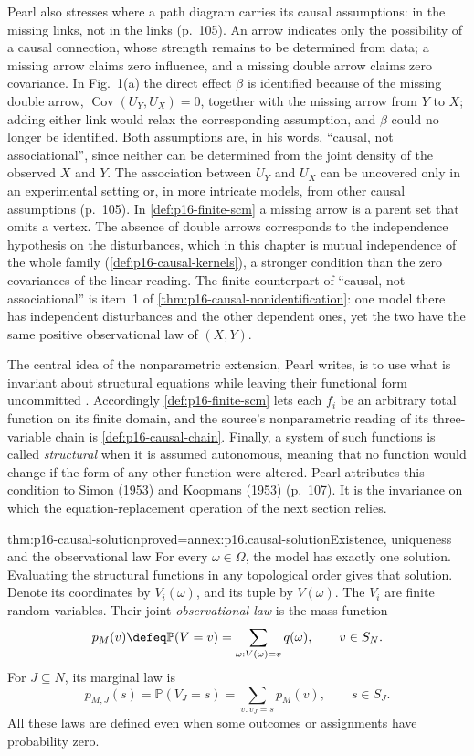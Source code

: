 Pearl also stresses where a path diagram carries its causal assumptions:
in the missing links, not in the links (p.~105). An arrow indicates only
the possibility of a causal connection, whose strength remains to be
determined from data; a missing arrow claims zero influence, and a
missing double arrow claims zero covariance. In Fig.~1(a) the direct
effect \(\beta\) is identified because of the missing double arrow,
\(\operatorname{Cov}(U_Y,U_X)=0\), together with the missing arrow from
\(Y\) to \(X\); adding either link would relax the corresponding
assumption, and \(\beta\) could no longer be identified. Both assumptions
are, in his words, ``causal, not associational'', since neither can be
determined from the joint density of the observed \(X\) and \(Y\). The
association between \(U_Y\) and \(U_X\) can be uncovered only in an
experimental setting or, in more intricate models, from other causal
assumptions (p.~105). In \cref{def:p16-finite-scm} a missing arrow is a
parent set that omits a vertex. The absence of double arrows corresponds
to the independence hypothesis on the disturbances, which in this chapter
is mutual independence of the whole family
(\cref{def:p16-causal-kernels}), a stronger condition than the zero
covariances of the linear reading. The finite counterpart of ``causal, not
associational'' is item~1 of \cref{thm:p16-causal-nonidentification}: one
model there has independent disturbances and the other dependent ones, yet
the two have the same positive observational law of \((X,Y)\).

The central idea of the nonparametric extension, Pearl writes, is to use
what is invariant about structural equations while leaving their
functional form uncommitted \cite[sec.~3.2, p.~107]{Pearl2009CausalOverview}.
Accordingly \cref{def:p16-finite-scm} lets each \(f_i\) be an arbitrary
total function on its finite domain, and the source's nonparametric reading
of its three-variable chain is \cref{def:p16-causal-chain}. Finally, a
system of such functions is called \emph{structural} when it is assumed
autonomous, meaning that no function would change if the form of any other
function were altered. Pearl attributes this condition to Simon (1953)
and Koopmans (1953) (p.~107). It is the invariance on which the
equation-replacement operation of the next section relies.

\begin{hbtheorem}{thm:p16-causal-solution}{proved=annex:p16.causal-solution}{Existence, uniqueness and the observational law}
For every \(\omega\in\Omega\), the model has exactly one solution.
Evaluating the structural functions in any topological order gives that
solution. Denote its coordinates by \(V_i(\omega)\), and its tuple by
\(V(\omega)\). The \(V_i\) are finite random variables. Their joint
\emph{observational law} is the mass function
\[
 p_M(v)\defeq\mathbb P(V=v)
       =\sum_{\omega:V(\omega)=v}q(\omega),\qquad v\in S_N.
\]
For \(J\subseteq N\), its marginal law is
\[
 p_{M,J}(s)=\mathbb P(V_J=s)
           =\sum_{v:v_J=s}p_M(v),\qquad s\in S_J.
\]
All these laws are defined even when some outcomes or assignments have
probability zero.
\end{hbtheorem}

